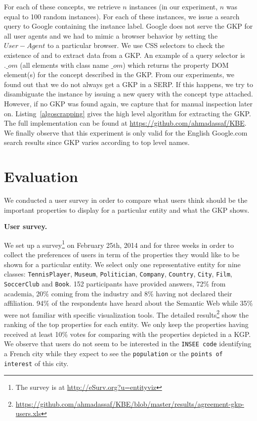 \documentclass[runningheads,a4paper]{../../Util/LaTEX/llncs}
\begin{document}
For each of these concepts, we retrieve $n$ instances (in our experiment, $n$ was equal to 100 random instances). For each of these instances, we issue a search query to Google containing the instance label. Google does not serve the GKP for all user agents and we had to mimic a browser behavior by setting the $User-Agent$ to a particular browser. We use CSS selectors to check the existence of and to extract data from a GKP. An example of a query selector is $.\_om$ (all elements with class name $\_om$) which returns the property DOM element(s) for the concept described in the GKP. From our experiments, we found out that we do not always get a GKP in a SERP. If this happens, we try to disambiguate the instance by issuing a new query with the concept type attached. However, if no GKP was found again, we capture that for manual inspection later on. Listing~\ref{algoscrapping} gives the high level algorithm for extracting the GKP. The full implementation can be found at \url{https://github.com/ahmadassaf/KBE}. We finally observe that this experiment is only valid for the English Google.com search results since GKP varies according to top level names.
\vspace{-0.6cm}


\section{Evaluation}
\label{sec:evaluation}
We conducted a user survey in order to compare what users think should be the important properties to display for a particular entity and what the GKP shows.

{\textbf{User survey.}}
\label{sec:survey}

We set up a survey\footnote{The survey is at \url{http://eSurv.org?u=entityviz}} on February 25th, 2014 and for three weeks in order to collect the preferences of users in term of the properties they would like to be shown for a particular entity. We select only one representative entity for nine classes: \texttt{TennisPlayer}, \texttt{Museum}, \texttt{Politician}, \texttt{Company}, \texttt{Country}, \texttt{City}, \texttt{Film}, \texttt{SoccerClub} and \texttt{Book}. 152 participants have provided answers, 72\% from academia, 20\% coming from the industry and 8\% having not declared their affiliation. 94\% of the respondents have heard about the Semantic Web while 35\% were not familiar with specific visualization tools. The detailed results\footnote{\url{https://github.com/ahmadassaf/KBE/blob/master/results/agreement-gkp-users.xls}} show the ranking of the top properties for each entity. We only keep the properties having received at least 10\% votes for comparing with the properties depicted in a KGP. We observe that users do not seem to be interested in the \texttt{INSEE code} identifying a French city while they expect to see the \texttt{population} or the \texttt{points of interest} of this city.
\end{document}

